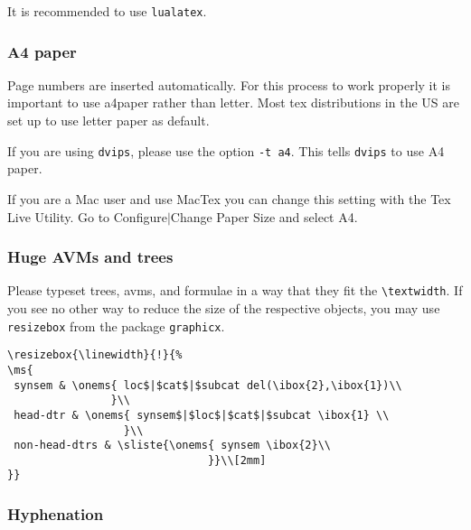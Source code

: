 \documentclass[11pt,a4paper,fleqn]{article}
\begin{document}
It is recommended to use \verb+lualatex+. 
%
%


\subsubsection{A4 paper}

Page numbers are inserted automatically. For this process to work properly it is important to use
a4paper rather than letter. Most tex distributions in the US are set up to use letter paper as default.

If you are using \verb+dvips+, please use the option \verb+-t a4+. This tells
\verb+dvips+ to use A4 paper.


If you are a Mac user and use MacTex you can change this setting with the Tex Live Utility. Go to
Configure$|$Change Paper Size and select A4.

\subsubsection{Huge AVMs and trees}
\label{huge}

Please typeset trees, avms, and formulae in a way that they fit the
\verb+\textwidth+. If you see no other way to reduce the size of the respective
objects, you may use \verb+resizebox+ from the package \verb+graphicx+.
{\small
\begin{verbatim}
\resizebox{\linewidth}{!}{%
\ms{
 synsem & \onems{ loc$|$cat$|$subcat del(\ibox{2},\ibox{1})\\
                }\\
 head-dtr & \onems{ synsem$|$loc$|$cat$|$subcat \ibox{1} \\
                  }\\
 non-head-dtrs & \sliste{\onems{ synsem \ibox{2}\\ 
                               }}\\[2mm]
}}
\end{verbatim}
}


\subsubsection{Hyphenation}
\label{hyphenation}
\end{document}
